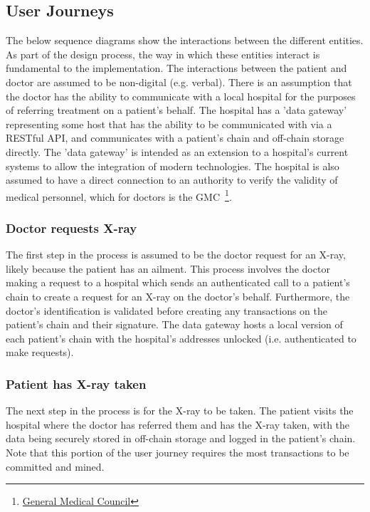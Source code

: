 \subsection{User Journeys}

The below sequence diagrams show the interactions between the different entities. As part of the design process, the way in which these entities interact is fundamental to the implementation. The interactions between the patient and doctor are assumed to be non-digital (e.g. verbal). There is an assumption that the doctor has the ability to communicate with a local hospital for the purposes of referring treatment on a patient's behalf. The hospital has a 'data gateway' representing some host that has the ability to be communicated with via a RESTful API, and communicates with a patient's chain and off-chain storage directly. The 'data gateway' is intended as an extension to a hospital's current systems to allow the integration of modern technologies. The hospital is also assumed to have a direct connection to an authority to verify the validity of medical personnel, which for doctors is the GMC~\footnote{\href{http://www.gmc-uk.org/}{General Medical Council}}.

\subsubsection{Doctor requests X-ray}

The first step in the process is assumed to be the doctor request for an X-ray, likely because the patient has an ailment. This process involves the doctor making a request to a hospital which sends an authenticated call to a patient's chain to create a request for an X-ray on the doctor's behalf. Furthermore, the doctor's identification is validated before creating any transactions on the patient's chain and their signature. The data gateway hosts a local version of each patient's chain with the hospital's addresses unlocked (i.e. authenticated to make requests).



\subsubsection{Patient has X-ray taken}

The next step in the process is for the X-ray to be taken. The patient visits the hospital where the doctor has referred them and has the X-ray taken, with the data being securely stored in off-chain storage and logged in the patient's chain. Note that this portion of the user journey requires the most transactions to be committed and mined.

